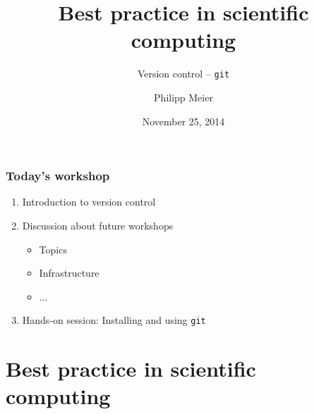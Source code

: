 \documentclass{beamer}
\title{Best practice in scientific computing}
\subtitle{Version control -- \texttt{git}}
\author[P.\ Meier]{Philipp Meier}
\date{November 25, 2014}
\institute[EAWAG]{Eawag: Swiss Federal Institute of Aquatic Science and Technology}
\begin{document}
\begin{frame}[t,plain]
\titlepage
\end{frame}


\begin{frame}
    \frametitle{Today's workshop}
    \begin{enumerate}
        \item Introduction to version control
        \item Discussion about future workshops
            \begin{itemize}
                \item Topics
                \item Infrastructure
                \item ...
            \end{itemize}
        \item Hands-on session: Installing and using \texttt{git}
    \end{enumerate}
\end{frame}

\section[Best practice]{Best practice in scientific computing}

\newlength{\blockheight}
\setlength{\blockheight}{22mm}
\end{document}
